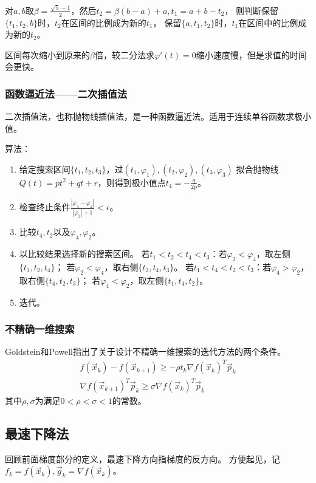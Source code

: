 对$a,b$取$\beta=\frac{\sqrt{5} - 1}{2}$，然后$t_2=\beta (b-a)+a, t_1=a+b-t_2$，
则判断保留$\{t_1,t_2,b\}$时，$t_2$在区间的比例成为新的$t_1$，
保留$\{a,t_1,t_2\}$时，$t_1$在区间中的比例成为新的$t_2$。

区间每次缩小到原来的$\beta$倍，较二分法求$\varphi'(t)=0$缩小速度慢，但是求值的时间会更快。

\subsubsection{函数逼近法——二次插值法}
二次插值法，也称抛物线插值法，是一种函数逼近法。适用于连续单谷函数求极小值。

算法：
\begin{enumerate}
    \item 给定搜索区间$\{t_1,t_2,t_3\}$，过$(t_1,\varphi_1),(t_2,\varphi_2),(t_3,\varphi_3)$
        拟合抛物线$Q(t)=pt^2+qt+r$，则得到极小值点$t_4=-\frac{q}{2p}$。
    \item 检查终止条件$\frac{|\varphi_4-\varphi_2|}{|\varphi_2|+1} < \epsilon$。
    \item 比较$t_4,t_2$以及$\varphi_4,\varphi_2$。
    \item 以比较结果选择新的搜索区间。
        若$t_1<t_2<t_4<t_3$：若$\varphi_2<\varphi_4$，取左侧$\{t_1,t_2,t_4\}$；
        若$\varphi_2<\varphi_4$，取右侧$\{t_2,t_4,t_3\}$。
        若$t_1<t_4<t_2<t_3$：若$\varphi_4>\varphi_2$，取右侧$\{t_4,t_2,t_3\}$；
        若$\varphi_4<\varphi_2$，取左侧$\{t_1,t_4,t_2\}$。
    \item 迭代。
\end{enumerate}

\subsubsection{不精确一维搜索}
Goldstein和Powell指出了关于设计不精确一维搜索的迭代方法的两个条件。
\begin{gather*}
    f\left(\vec{x}_{k}\right)-f\left(\vec{x}_{k+1}\right) \geq-\rho t_{k} \nabla f\left(\vec{x}_{k}\right)^{T} \vec{p}_{k}\\
    \nabla f\left(\vec{x}_{k+1}\right)^{T} \vec{p}_{k} \geq \sigma \nabla f\left(\vec{x}_{k}\right)^{T} \vec{p}_{k}
\end{gather*}
其中$\rho,\sigma$为满足$0<\rho<\sigma<1$的常数。

\subsection{最速下降法}
回顾前面梯度部分的定义，最速下降方向指梯度的反方向。
方便起见，记$f_k=f(\vec{x}_k),\vec{g}_k=\nabla f(\vec{x}_k)$。

